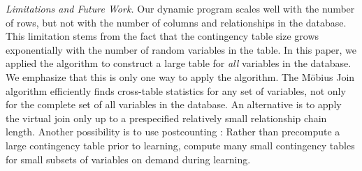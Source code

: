\documentclass{sig-alternate-2013}
\newcommand{\ct}{\mathit{ct}}
\begin{document}
%
%



\emph{Limitations and Future Work.} 
Our dynamic program scales well with the number of rows, but not with the number of columns and relationships in the database. 
This limitation stems from the fact that the contingency table size grows exponentially with the number of random variables in the table. In this paper, we applied the algorithm to construct a large table for {\em all} variables in the database. We emphasize that this is only one way to apply the algorithm. The M\"obius Join algorithm efficiently finds cross-table statistics for any set of variables, not only for the complete set of all variables in the database. An alternative is to apply the virtual join only up to a prespecified relatively small relationship chain length.
Another possibility is to use postcounting \cite{lv2012}: Rather than precompute a large contingency table prior to learning, compute many small contingency tables for  small subsets of variables on demand during learning. 
%
%
\end{document}
